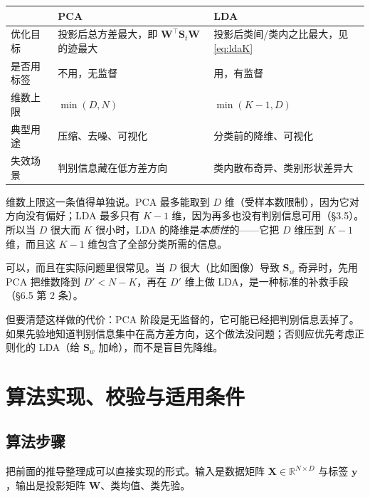 \documentclass[11pt,a4paper,fontset=windows,zihao=-4]{ctexart}
\newcommand{\R}{\mathbb{R}}
\newcommand{\bX}{\mathbf{X}}
\newcommand{\by}{\mathbf{y}}
\newcommand{\bS}{\mathbf{S}}
\newcommand{\bW}{\mathbf{W}}
\newcommand{\tp}{^{\top}}
\newcommand{\tabhead}{\sffamily\bfseries\color{navy}}
\begin{document}
\begin{center}
\small
\begin{tabular}{@{}p{2.5cm}p{5.2cm}p{5.2cm}@{}}
\toprule
\rowcolor{navy!7}
\tabhead & \tabhead PCA & \tabhead LDA\\
\midrule
优化目标 & 投影后总方差最大，即 $\bW\tp\bS_t\bW$ 的迹最大 & 投影后类间/类内之比最大，见 \eqref{eq:ldaK}\\[3pt]
是否用标签 & 不用，无监督 & 用，有监督\\[3pt]
维数上限 & $\min(D,N)$ & $\min(K-1,D)$\\[3pt]
典型用途 & 压缩、去噪、可视化 & 分类前的降维、可视化\\[3pt]
失效场景 & 判别信息藏在低方差方向 & 类内散布奇异、类别形状差异大\\
\bottomrule
\end{tabular}
\end{center}

维数上限这一条值得单独说。PCA 最多能取到 $D$ 维（受样本数限制），因为它对方向没有偏好；LDA 最多只有 $K-1$ 维，因为再多也没有判别信息可用（\S3.5）。所以当 $D$ 很大而 $K$ 很小时，LDA 的降维是\emph{本质性}的——它把 $D$ 维压到 $K-1$ 维，而且这 $K-1$ 维包含了全部分类所需的信息。

\begin{add}
可以，而且在实际问题里很常见。当 $D$ 很大（比如图像）导致 $\bS_w$ 奇异时，先用 PCA 把维数降到 $D'<N-K$，再在 $D'$ 维上做 LDA，是一种标准的补救手段（\S6.5 第 2 条）。

但要清楚这样做的代价：PCA 阶段是无监督的，它可能已经把判别信息丢掉了。如果先验地知道判别信息集中在高方差方向，这个做法没问题；否则应优先考虑正则化的 LDA（给 $\bS_w$ 加岭），而不是盲目先降维。
\end{add}


\section{算法实现、校验与适用条件}\label{sec:impl}

\subsection{算法步骤}

把前面的推导整理成可以直接实现的形式。输入是数据矩阵 $\bX\in\R^{N\times D}$ 与标签 $\by$，输出是投影矩阵 $\bW$、类均值、类先验。
\end{document}
